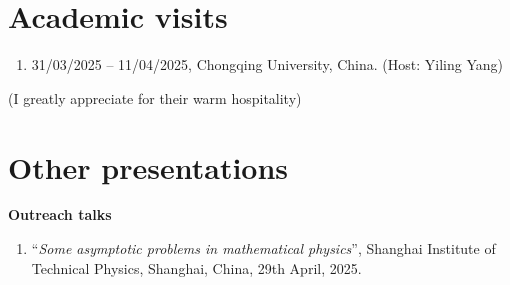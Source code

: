\documentclass[margin]{res}
\begin{document}
\begin{resume}
\section{Academic visits}
\begin{enumerate}[--]
\item 31/03/2025 -- 11/04/2025, Chongqing University, China. (Host: Yiling Yang)
\end{enumerate}
(I greatly appreciate for their warm hospitality)


\section{Other presentations}
\textbf{Outreach talks}
\begin{enumerate}[--]
\item ``{\sl Some asymptotic problems in mathematical physics}'', Shanghai Institute of Technical Physics, Shanghai, China, 29th April, 2025.
\end{enumerate}


\end{resume}
\end{document}
